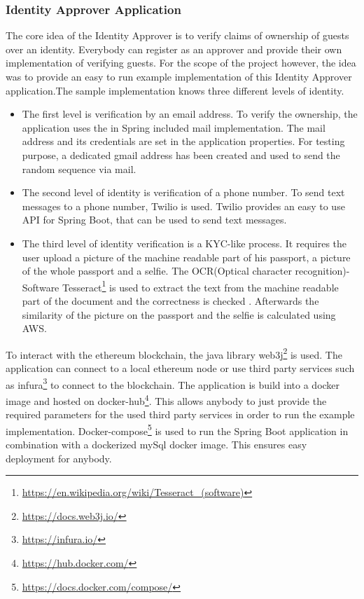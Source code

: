 \subsubsection{Identity Approver Application}

The core idea of the Identity Approver is to verify claims of ownership of guests over an identity. Everybody can register as an approver and provide their own implementation of verifying guests. For the scope of the project however, the idea was to provide an easy to run example implementation of this Identity Approver application.The sample implementation knows three different levels of identity.

\begin{itemize}
    \item The first level is verification by an email address. To verify the ownership, the application uses the in Spring included mail implementation. The mail address and its credentials are set in the application properties. For testing purpose, a dedicated gmail address has been created and used to send the random sequence via mail.
    
    \item The second level of identity is verification of a phone number. To send text messages to a phone number, Twilio is used. Twilio provides an easy to use API for Spring Boot, that can be used to send text messages. 
    
    \item The third level of identity verification is a KYC-like process. It requires the user upload a picture of the machine readable part of his passport, a picture of the whole passport and a selfie. The OCR(Optical character recognition)-Software Tesseract\footnote{\url{https://en.wikipedia.org/wiki/Tesseract_(software)}} is used to extract the text from the machine readable part of the document and the correctness is checked . Afterwards the similarity of the picture on the passport and the selfie is calculated using AWS. 
\end{itemize}

To interact with the ethereum blockchain, the java library web3j\footnote{\url{https://docs.web3j.io/}} is used. 
The application can connect to a local ethereum node or use third party services such as infura\footnote{\url{https://infura.io/}} to connect to the blockchain.
The application is build into a docker image and hosted on docker-hub\footnote{\url{https://hub.docker.com/}}. This allows anybody to just provide the required parameters for the used third party services in order to run the example implementation.  
Docker-compose\footnote{\url{https://docs.docker.com/compose/}} is used to run the Spring Boot application in combination with a dockerized mySql docker image. This ensures easy deployment for anybody.


